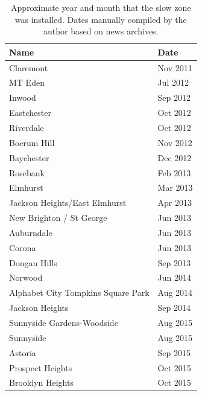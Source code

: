 \documentclass[10pt,journal,compsoc]{IEEEtran}
\begin{document}
\begin{table}[H]
\centering

\caption*{Approximate year and month that the slow zone  was installed.  Dates manually compiled by the author based on news archives. }

\begin{tabular}{|l|l|}
\hline
                                  Name &  Date \\ \hline
                          Claremont &  Nov 2011 \\ \hline
                            MT Eden &  Jul 2012 \\ \hline
                             Inwood &  Sep 2012 \\ \hline
                        Eastchester &  Oct 2012 \\ \hline
                          Riverdale &  Oct 2012 \\ \hline
                        Boerum Hill &  Nov 2012 \\ \hline
                         Baychester &  Dec 2012 \\ \hline
                           Rosebank &  Feb 2013 \\ \hline
                           Elmhurst &  Mar 2013 \\ \hline
      Jackson Heights/East Elmhurst &  Apr 2013 \\ \hline
           New Brighton / St George &  Jun 2013 \\ \hline
                         Auburndale &  Jun 2013 \\ \hline
                             Corona &  Jun 2013 \\ \hline
                       Dongan Hills &  Sep 2013 \\ \hline
                           Norwood &  Jun 2014 \\ \hline
 Alphabet City Tompkins Square Park &  Aug 2014 \\ \hline
                    Jackson Heights &  Sep 2014 \\ \hline
         Sunnyside Gardens-Woodside &  Aug 2015 \\ \hline
                          Sunnyside &  Aug 2015 \\ \hline
                            Astoria &  Sep 2015 \\ \hline
                   Prospect Heights &  Oct 2015 \\ \hline
                   Brooklyn Heights &  Oct 2015 \\ \hline
\end{tabular}
\end{table}
\end{document}
